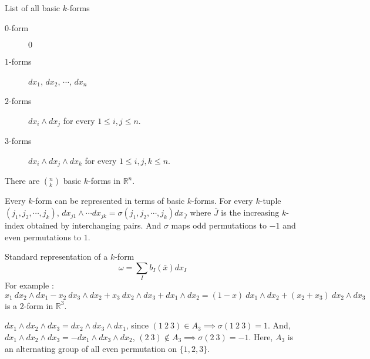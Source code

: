 \begin{remark} List of all basic $k$-forms
	\begin{description}
		\item[$0$-form] $0$
		\item[$1$-forms] $dx_1$, $dx_2$, $\cdots$, $dx_n$
		\item[$2$-forms] $dx_i \wedge dx_j$ for every $1 \le i,j \le n$.
		\item[$3$-forms] $dx_i \wedge dx_j \wedge dx_k$ for every $1 \le i,j,k \le n$.
	\end{description}
\end{remark}
	
\begin{remark}
	There are $(^n_k)$ basic $k$-forms in $\mathbb{R}^n$.

	Every $k$-form can be represented in terms of basic $k$-forms.
	For every $k$-tuple $(j_1,j_2,\cdots,j_k)$, $dx_{j1} \wedge \cdots dx_{jk} = \sigma(j_1,j_2,\cdots,j_k)dx_{\bar{J}}$ where $\bar{J}$ is the increasing $k$-index obtained by interchanging pairs.
	And $\sigma$ maps odd permutations to $-1$ and even permutations to $1$.

	Standard representation of a $k$-form
	\begin{equation}
		\omega = \sum_I b_I(\bar{x})dx_I
	\end{equation}
	For example : $x_1\ dx_2 \wedge dx_1 - x_2\ dx_3 \wedge dx_2 + x_3\ dx_2 \wedge dx_3 + dx_1 \wedge dx_2 = (1-x)\ dx_1 \wedge dx_2 + (x_2+x_3)\ dx_2 \wedge dx_3$ is a 2-form in $\mathbb{R}^3$.
\end{remark}

\begin{commentary}
	$dx_1 \wedge dx_2 \wedge dx_3 = dx_2 \wedge dx_3 \wedge dx_1$,
	since $(1\ 2\ 3) \in A_3 \implies \sigma(1\ 2\ 3) = 1$.
	And, $dx_1 \wedge dx_2 \wedge dx_3 = -dx_1 \wedge dx_3 \wedge dx_2$,
	$(2\ 3) \notin A_3 \implies \sigma(2\ 3) = -1$.
	Here, $A_3$ is an alternating group of all even permutation on $\{1,2,3\}$.
\end{commentary}

